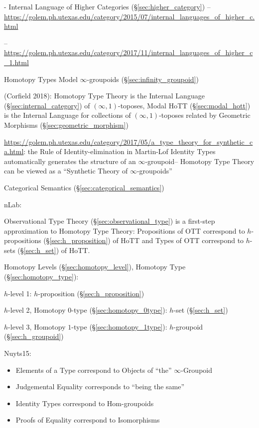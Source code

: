 {- Internal Language of Higher Categories (\S\ref{sec:higher_category})
--\url{https://golem.ph.utexas.edu/category/2015/07/internal_languages_of_higher_c.html}

--\url{https://golem.ph.utexas.edu/category/2017/11/internal_languages_of_higher_c_1.html}

Homotopy Types Model $\infty$-groupoids (\S\ref{sec:infinity_groupoid})

(Corfield 2018): Homotopy Type Theory is the Internal Language
(\S\ref{sec:internal_category}) of $(\infty,1)$-toposes, Modal HoTT
(\S\ref{sec:modal_hott}) is the Internal Language for collections of
$(\infty,1)$-toposes related by Geometric Morphisms
(\S\ref{sec:geometric_morphism})

\url{https://golem.ph.utexas.edu/category/2017/05/a_type_theory_for_synthetic_ca.html}:
the Rule of Identity-elimination in Martin-Lof Identity Types
automatically generates the structure of an $\infty$-groupoid--
Homotopy Type Theory can be viewed as a ``Synthetic Theory of
$\infty$-groupoids''

Categorical Semantics (\S\ref{sec:categorical_semantics})

nLab:

Observational Type Theory (\S\ref{sec:observational_type}) is a
first-step approximation to Homotopy Type Theory: Propositions of OTT
correspond to $h$-propositions (\S\ref{sec:h_proposition}) of HoTT and
Types of OTT correspond to $h$-sets (\S\ref{sec:h_set}) of HoTT.

Homotopy Levels (\S\ref{sec:homotopy_level}), Homotopy Type
(\S\ref{sec:homotopy_type}):

$h$-level 1: $h$-proposition (\S\ref{sec:h_proposition})

$h$-level 2, Homotopy $0$-type (\S\ref{sec:homotopy_0type}): $h$-set
(\S\ref{sec:h_set})

$h$-level 3, Homotopy $1$-type (\S\ref{sec:homotopy_1type}):
$h$-groupoid (\S\ref{sec:h_groupoid})


Nuyts15:

\begin{itemize}
  \item Elements of a Type correspond to Objects of ``the''
    $\infty$-Groupoid
  \item Judgemental Equality corresponds to ``being the same''
  \item Identity Types correspond to Hom-groupoids
  \item Proofs of Equality correspond to Isomorphisms
\end{itemize}

}
